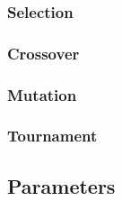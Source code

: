 \subsubsection{Selection}

\subsubsection{Crossover}

\subsubsection{Mutation}

\subsubsection{Tournament}

\subsection{Parameters}


